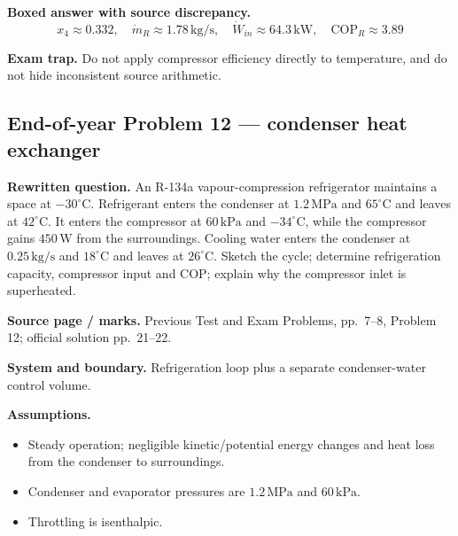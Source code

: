 \textbf{Boxed answer with source discrepancy.}
\[
\boxed{x_4\approx0.332,\quad \dot m_R\approx1.78\,\mathrm{kg/s},\quad \dot W_{in}\approx64.3\,\mathrm{kW},\quad \mathrm{COP}_R\approx3.89}
\]
\begin{center}
\end{center}

\textbf{Exam trap.} Do not apply compressor efficiency directly to temperature, and do not hide inconsistent source arithmetic.

\subsection*{End-of-year Problem 12 --- condenser heat exchanger}
\textbf{Rewritten question.} An R-134a vapour-compression refrigerator maintains a space at $-30^\circ\mathrm{C}$. Refrigerant enters the condenser at $1.2\,\mathrm{MPa}$ and $65^\circ\mathrm{C}$ and leaves at $42^\circ\mathrm{C}$. It enters the compressor at $60\,\mathrm{kPa}$ and $-34^\circ\mathrm{C}$, while the compressor gains $450\,\mathrm{W}$ from the surroundings. Cooling water enters the condenser at $0.25\,\mathrm{kg/s}$ and $18^\circ\mathrm{C}$ and leaves at $26^\circ\mathrm{C}$. Sketch the cycle; determine refrigeration capacity, compressor input and COP; explain why the compressor inlet is superheated.

\textbf{Source page / marks.} Previous Test and Exam Problems, pp.~7--8, Problem 12; official solution pp.~21--22.

\textbf{System and boundary.} Refrigeration loop plus a separate condenser-water control volume.

\textbf{Assumptions.}
\begin{itemize}
  \item Steady operation; negligible kinetic/potential energy changes and heat loss from the condenser to surroundings.
  \item Condenser and evaporator pressures are $1.2\,\mathrm{MPa}$ and $60\,\mathrm{kPa}$.
  \item Throttling is isenthalpic.
\end{itemize}

